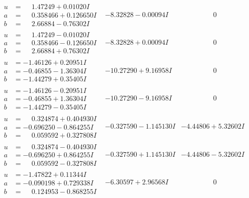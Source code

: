 \documentclass[1p]{elsarticle_modified}
\theoremstyle{definition}
\begin{document}
$$\begin{array}{c|c|c}
\begin{aligned}
u &= \phantom{-}1.47249 + 0.01020 I \\
a &= \phantom{-}0.358466 + 0.126650 I \\
b &= \phantom{-}2.66884 - 0.76302 I\end{aligned}
 & -8.32828 - 0.00094 I & \phantom{-0.000000 } 0 \\ \hline\begin{aligned}
u &= \phantom{-}1.47249 - 0.01020 I \\
a &= \phantom{-}0.358466 - 0.126650 I \\
b &= \phantom{-}2.66884 + 0.76302 I\end{aligned}
 & -8.32828 + 0.00094 I & \phantom{-0.000000 } 0 \\ \hline\begin{aligned}
u &= -1.46126 + 0.20951 I \\
a &= -0.46855 - 1.36304 I \\
b &= -1.44279 + 0.35405 I\end{aligned}
 & -10.27290 + 9.16958 I & \phantom{-0.000000 } 0 \\ \hline\begin{aligned}
u &= -1.46126 - 0.20951 I \\
a &= -0.46855 + 1.36304 I \\
b &= -1.44279 - 0.35405 I\end{aligned}
 & -10.27290 - 9.16958 I & \phantom{-0.000000 } 0 \\ \hline\begin{aligned}
u &= \phantom{-}0.324874 + 0.404930 I \\
a &= -0.696250 - 0.864255 I \\
b &= \phantom{-}0.059592 + 0.327808 I\end{aligned}
 & -0.327590 - 1.145130 I & -4.44806 + 5.32602 I \\ \hline\begin{aligned}
u &= \phantom{-}0.324874 - 0.404930 I \\
a &= -0.696250 + 0.864255 I \\
b &= \phantom{-}0.059592 - 0.327808 I\end{aligned}
 & -0.327590 + 1.145130 I & -4.44806 - 5.32602 I \\ \hline\begin{aligned}
u &= -1.47822 + 0.11344 I \\
a &= -0.090198 + 0.729338 I \\
b &= \phantom{-}0.124953 - 0.868255 I\end{aligned}
 & -6.30597 + 2.96568 I & \phantom{-0.000000 } 0 \\ \hline\begin{aligned}

\end{aligned}
\end{array}$$
\end{document}
